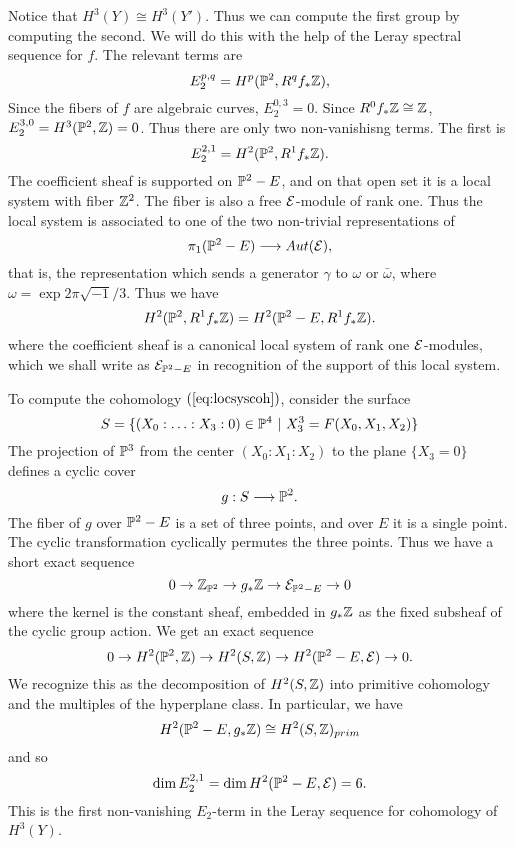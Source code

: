 \documentclass[11pt]{amsart}
\begin{document}
Notice that $H^3(Y) \cong H^3(Y')$.  Thus we can compute the first group
by computing the second.  We will do this with the help of the Leray
spectral sequence for $f$.  The relevant terms are
\[
   E_2^{p,q} = H^p({\mathbb P}^2, R^qf_*{\mathbb Z}),
\]
Since the fibers of $f$ are algebraic curves, $E_2^{0,3} = 0$.  Since $R^0f_*{\mathbb Z} \cong {\mathbb Z}$,
$E_2^{3,0} = H^3({\mathbb P}^2, {\mathbb Z}) = 0$.  Thus there are only two non-vanishisng terms. 
The first is
\begin{equation}
\label{leray21}
   E_2^{2,1} = H^2({\mathbb P}^2, R^1f_*{\mathbb Z}).
\end{equation}
The coefficient sheaf is supported on ${\mathbb P}^2 - E$, and on that open set it is 
a local system with fiber ${\mathbb Z}^2$.  The fiber is also a free ${\mathcal E}$-module of
rank one.  Thus the local system is associated to one of the two non-trivial representations
of 
\[
    \pi_1({\mathbb P}^2 - E) \longrightarrow Aut({\mathcal E}),
\]
that is, the representation which sends a generator $\gamma$ to $\omega$ or $\bar\omega$,
where $\omega = \exp 2\pi \sqrt{-1}/3$.
Thus we have
\begin{equation}
\label{eq:locsyscoh}
   H^2({\mathbb P}^2, R^1f_*{\mathbb Z}) = H^2({\mathbb P}^2 - E, R^1f_*{\mathbb Z}).
\end{equation}
where the coefficient sheaf is a canonical local system of rank one ${\mathcal E}$-modules,
which we shall write as ${\mathcal E}_{{\mathbb P}^2 - E}$ in recognition of the support
of this local system.

To compute the cohomology $(\ref{eq:locsyscoh})$, consider the surface 
\[
  S = \{(X_0: \ldots : X_3:0) \in {\mathbb P}^4\ |\ X_3^3 = F(X_0,X_1,X_2)\}
\]
The projection of ${\mathbb P}^3$ from the center $(X_0 : X_1 :  X_2)$ to the plane $\{X_3=0\}$
defines a cyclic cover
\[
   g: S \longrightarrow {\mathbb P}^2.
\] 
The fiber of $g$ over ${\mathbb P}^2 - E$ is a set of three points, and over $E$ it is a single
point.  The cyclic transformation cyclically permutes the three points.  Thus we have a short exact sequence 
\[
  0 \to {\mathbb Z}_{{\mathbb P}^2}\to  g_*{\mathbb Z}  \to  {\mathcal E}_{{\mathbb P}^2 - E} \to 0
\]
where the kernel is the constant sheaf, embedded in $g_*{\mathbb Z} $ as the fixed subsheaf of the cyclic group action.   We get an exact sequence
\[
   0 \to H^2({\mathbb P}^2, {\mathbb Z}) \to H^2(S, {\mathbb Z}) \to  H^2({\mathbb P}^2 - E, {\mathcal E}) \to 0.
\]
We recognize this as the decomposition of $H^2(S,{\mathbb Z})$ into primitive 
cohomology and the multiples of the hyperplane class.  In particular, we have
\[
   H^2({\mathbb P}^2 - E, g_*{\mathbb Z}) \cong H^2(S,{\mathbb Z})_{prim}
\]
and so
\begin{equation}
\label{rankleray21}
  \dim E_2^{2,1} =  \dim H^2({\mathbb P}^2 - E, {\mathcal E}) = 6.
\end{equation}
This is the first non-vanishing $E_2$-term in the Leray sequence for cohomology of $H^3(Y)$.
\end{document}
